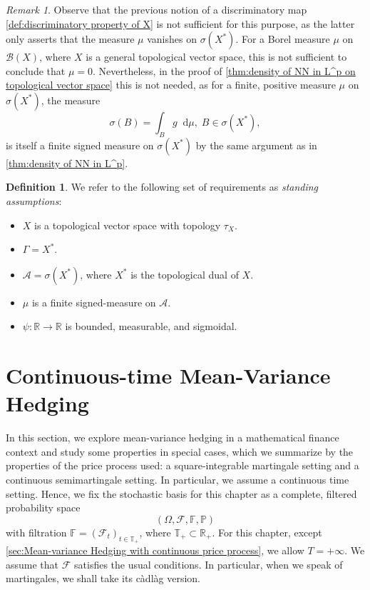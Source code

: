 \documentclass[11pt,a4paper,twoside,openany]{report}
\newcommand{\diff}{\mathop{}\!\mathrm{d}}
\theoremstyle{plain} %
\theoremstyle{definition} %
\newtheorem{definition}[definition]{Definition}
\theoremstyle{remark} %
\newtheorem{remark}[remark]{Remark}
\begin{document}
 \begin{remark}
     Observe that the previous notion of a discriminatory map \cref{def:discriminatory property of X} is not sufficient for this purpose, as the latter only asserts that the measure \(\mu\) vanishes on \(\sigma(X^*)\). For a Borel measure \(\mu\) on \(\mathcal{B}(X)\), where \(X\) is a general topological vector space, this is not sufficient to conclude that \(\mu=0\). Nevertheless, in the proof of \cref{thm:density of NN in L^p on topological vector space} this is not needed, as for a finite, positive measure \(\mu\) on \(\sigma(X^*)\), the measure 
     \begin{equation}
     \sigma(B)=\int_B g\diff \mu,\;B\in\sigma(X^*),    
     \end{equation} is itself a finite signed measure on \(\sigma(X^*)\) by the same argument as in \cref{thm:density of NN in L^p}. 
\end{remark}

\begin{definition}\label{def:standing assumptions}
    We refer to the following set of requirements as \textit{standing assumptions}:
    \begin{itemize}
    \item \(X\) is a topological vector space with topology \(\tau_X\).
    \item \(\Gamma=X^*\).
    \item \(\mathcal{A}=\sigma(X^*)\), where \(X^*\) is the topological dual of \(X\).
    \item \(\mu\) is a finite signed-measure on \(\mathcal{A}\).
    \item \(\psi:\mathbb{R}\to\mathbb{R}\) is bounded, measurable, and sigmoidal. 
\end{itemize}
\end{definition}


\chapter{Continuous-time Mean-Variance Hedging}\label{ch:continuous time mean variance hedging}
In this section, we explore mean-variance hedging in a mathematical finance context and study some properties in special cases, which we summarize by the properties of the price process used: a square-integrable martingale setting and a continuous semimartingale setting. In particular, we assume a continuous time setting. Hence, we fix the stochastic basis for this chapter as a complete, filtered probability space
\begin{equation}
    (\Omega,\mathcal{F},\mathbb{F},\mathbb{P}) 
\end{equation}
with filtration \(\mathbb{F}=(\mathcal{F}_t)_{t\in\mathbb{T}_+}\), where \(\mathbb{T}_+\subset\mathbb{R}_+\). For this chapter, except \cref{sec:Mean-variance Hedging with continuous price process}, we allow \(T=+\infty\). We assume that \(\mathcal{F}\) satisfies the usual conditions. In particular, when we speak of martingales, we shall take its càdlàg version.
\end{document}
